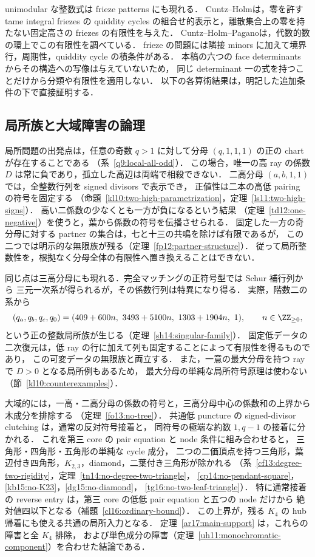 unimodular な整数式は frieze patterns にも現れる．
Cuntz--Holm\cite[\S\S2--3 and~7]{CuntzHolmFriezes}は，零を許す tame integral friezes の
quiddity cycles の組合せ的表示と，離散集合上の零を持たない固定高さの friezes の有限性を与えた．
Cuntz--Holm--Pagano\cite{CuntzHolmPagano}は，代数的数の環上でこの有限性を調べている．
frieze の問題には隣接 minors に加えて境界行，周期性，quiddity cycle の積条件がある．
本稿の六つの face determinants からその構造への写像は与えていないため，
同じ determinant 一の式を持つことだけから分類や有限性を適用しない．
以下の各算術結果は，明記した追加条件の下で直接証明する．

\subsection{局所族と大域障害の論理}

局所問題の出発点は，任意の奇数 $q>1$ に対して分母 $(q,1,1,1)$ の正の chart が存在することである
（系~\ref{q9:local-all-odd}）．
この場合，唯一の高 ray の係数 $D$ は常に負であり，孤立した高辺は両端で相殺できない．
二高分母 $(a,b,1,1)$ では，全整数行列を signed divisors で表示でき，
正値性は二本の高低 pairing の符号を固定する
（命題~\ref{kl10:two-high-parametrization}，定理~\ref{ls11:two-high-signs}）．
高い二係数の少なくとも一方が負になるという結果
（定理~\ref{td12:one-negative}）を使うと，葉から係数の符号を伝播させられる．
固定した一方の奇分母に対する partner の集合は，七と十三の共鳴を除けば有限であるが，
この二つでは明示的な無限族が残る（定理~\ref{fp12:partner-structure}）．
従って局所整数性を，根拠なく分母全体の有限性へ置き換えることはできない．

同じ点は三高分母にも現れる．完全マッチングの正符号型では Schur 補行列から
三元一次系が得られるが，その係数行列は特異になり得る．
実際，階数二の系から
\[
 (q_a,q_b,q_c,q_0)
 =(409+600n,\ 3493+5100n,\ 1303+1904n,\ 1),
 \qquad n\in\ZZ_{\ge0},
\]
という正の整数局所族が生じる（定理~\ref{sh14:singular-family}）．
固定低データの二次復元は，低 ray の行に加えて列も固定することによって有限性を得るものであり，
この可変データの無限族と両立する．
また，一意の最大分母を持つ ray で $D>0$ となる局所例もあるため，
最大分母の単純な局所符号原理は使わない（節~\ref{kl10:counterexamples}）．

大域的には，一高・二高分母の係数の符号と，三高分母中心の係数和の上界から木成分を排除する
（定理~\ref{fo13:no-tree}）．
共通低 puncture の signed-divisor clutching は，通常の反対符号接着と，
同符号の極端な約数 $1,q-1$ の接着に分かれる．
これを第三 core の pair equation と node 条件に組み合わせると，
三角形・四角形・五角形の単純な cycle 成分，
二つの二価頂点を持つ三角形，葉辺付き四角形，$K_{2,3}$，diamond，二葉付き三角形が除かれる
（系~\ref{cf13:degree-two-rigidity}，定理~\ref{tn14:no-degree-two-triangle}，
\ref{cp14:no-pendant-square}，\ref{kb15:no-K23}，\ref{dg15:no-diamond}，
\ref{tg16:no-two-leaf-triangle}）．
特に通常接着の reverse entry は，第三 core の低低 pair equation と五つの node だけから
絶対値四以下となる（補題~\ref{cl16:ordinary-bound}）．
この上界が，残る $K_4$ の hub 帰着にも使える共通の局所入力となる．
定理~\ref{ar17:main-support} は，これらの障害と全 $K_4$ 排除，
および単色成分の障害（定理~\ref{uh11:monochromatic-component}）を合わせた結論である．

